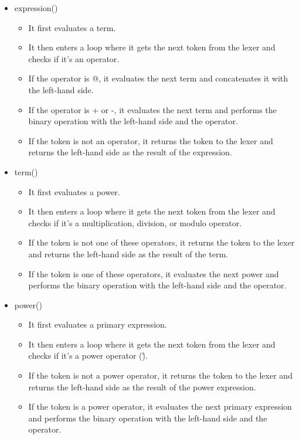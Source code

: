 \begin{itemize}
    \item expression{()}
        \begin{itemize}
            \item It first evaluates a term.
            \item It then enters a loop where it gets the next token from the lexer and checks if it's an operator.
            \item If the operator is @, it evaluates the next term and concatenates it with the left-hand side.
            \item If the operator is + or -, it evaluates the next term and performs the binary operation with the left-hand side and the operator.
            \item If the token is not an operator, it returns the token to the lexer and returns the left-hand side as the result of the expression.
        \end{itemize}
    \item term{()}
        \begin{itemize}
            \item It first evaluates a power.
            \item It then enters a loop where it gets the next token from the lexer and checks if it's a multiplication, division, or modulo operator.
            \item If the token is not one of these operators, it returns the token to the lexer and returns the left-hand side as the result of the term.
            \item If the token is one of these operators, it evaluates the next power and performs the binary operation with the left-hand side and the operator.
        \end{itemize}
    \item power{()}
        \begin{itemize}
            \item It first evaluates a primary expression.
            \item It then enters a loop where it gets the next token from the lexer and checks if it's a power operator (\^).
            \item If the token is not a power operator, it returns the token to the lexer and returns the left-hand side as the result of the power expression.
            \item If the token is a power operator, it evaluates the next primary expression and performs the binary operation with the left-hand side and the operator.

\end{itemize}
\end{itemize}
